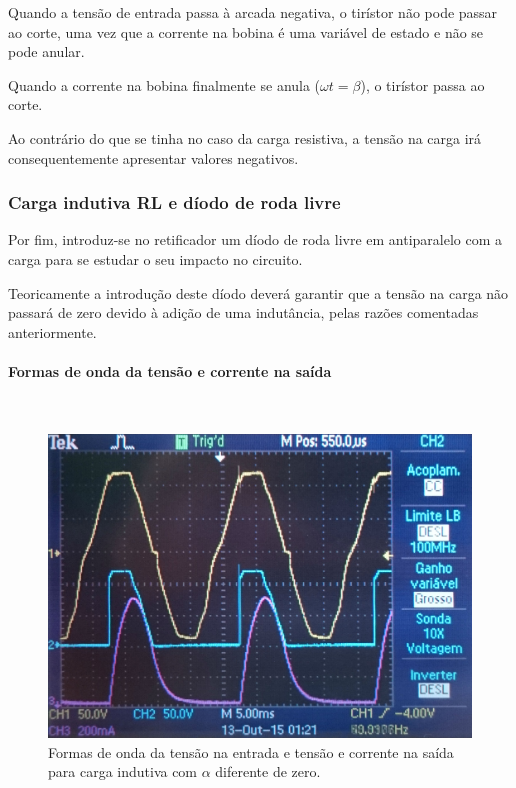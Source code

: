 \documentclass[a4paper,11pt]{article}
\numberwithin{equation}{section}
\begin{document}
Quando a tensão de entrada passa à arcada negativa, o tirístor não pode passar ao corte, uma vez que a corrente na bobina é uma variável de estado e não se pode anular.

Quando a corrente na bobina finalmente se anula ($\omega t = \beta$), o tirístor passa ao corte.

Ao contrário do que se tinha no caso da carga resistiva, a tensão na carga irá consequentemente apresentar valores negativos.


\subsubsection{Carga indutiva RL e díodo de roda livre}

Por fim, introduz-se no retificador um díodo de roda livre em antiparalelo com a carga para se estudar o seu impacto no circuito.

Teoricamente a introdução deste díodo deverá garantir que a tensão na carga não passará de zero devido à adição de uma indutância, pelas razões comentadas anteriormente.


\paragraph{Formas de onda da tensão e corrente na saída \label{parag:1}}\mbox{}\

\begin{figure}[h]
	\centering
	\includegraphics[keepaspectratio=true, scale=0.11]{img/figs/bobine_alfa_dif_zero}
	\caption{Formas de onda da tensão na entrada e tensão e corrente na saída para carga indutiva com $\alpha$ diferente de zero.}
	\label{fig:bobine_alfa_dif_zero}
	\vspace{-0.8em}
\end{figure}
\end{document}
